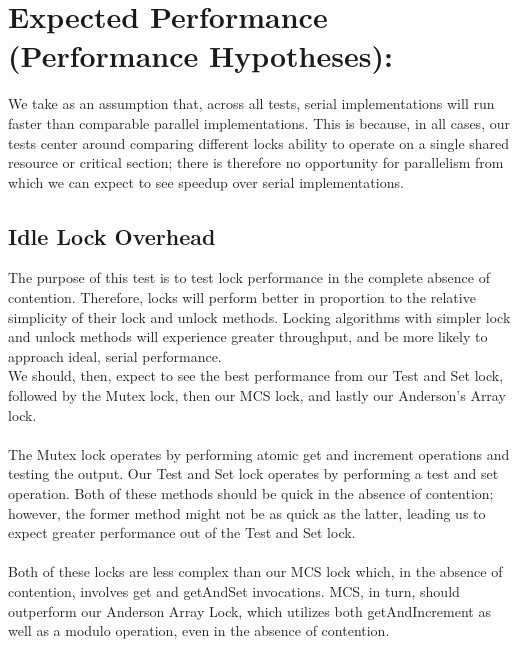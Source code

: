 \documentclass[]{article}
\begin{document}
\section{Expected Performance (Performance Hypotheses):}
We take as an assumption that, across all tests, serial implementations will run faster than comparable parallel implementations. This is because, in all cases, our tests center around comparing different locks ability to operate on a single shared resource or critical section; there is therefore no opportunity for parallelism from which we can expect to see speedup over serial implementations.

\subsection{Idle Lock Overhead}
The purpose of this test is to test lock performance in the complete absence of contention. Therefore, locks will perform better in proportion to the relative simplicity of their lock and unlock methods. Locking algorithms with simpler lock and unlock methods will experience greater throughput, and be more likely to approach ideal, serial performance.
\\
We should, then, expect to see the best performance from our Test and Set lock, followed by the Mutex lock, then our MCS lock, and lastly our Anderson's Array lock. 
\\\\
The Mutex lock operates by performing atomic get and increment operations and testing the output. Our Test and Set lock operates by performing a test and set operation. Both of these methods should be quick in the absence of contention; however, the former method might not be as quick as the latter, leading us to expect greater performance out of the Test and Set lock.
\\\\
Both of these locks are less complex than our MCS lock which, in the absence of contention, involves get and getAndSet invocations. MCS, in turn, should outperform our Anderson Array Lock, which utilizes both getAndIncrement as well as a modulo operation, even in the absence of contention.
\end{document}
